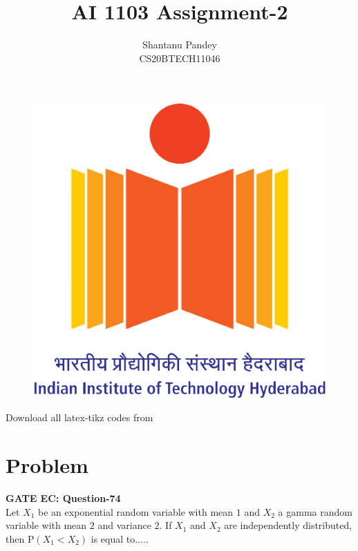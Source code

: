 \documentclass[twocolumn]{article}
\title{AI 1103 Assignment-2}
\author{Shantanu Pandey\\ CS20BTECH11046}
\date{}
\providecommand{\brak}[1]{\ensuremath{\left(#1\right)}}
\begin{document}
\maketitle
\noindent

\begin{figure} [h]
    \includegraphics[width = 0.6\columnwidth]{Logo.png}
\end{figure}
\vspace{0.3cm}

Download all latex-tikz codes from  

\vspace{0.3cm}  
    
   
\vspace{0.5cm}
\section*{Problem}
\textbf{GATE EC: Question-74 } \\
 Let $X_1$ be an exponential random variable with
mean $1$ and $X_2$ a gamma random variable with
mean $2$ and variance $2$. If $X_1$ and $X_2$ are
independently distributed, then $\mathrm{P}\brak{X_1 < X_2}$
is equal to.....
\end{document}
